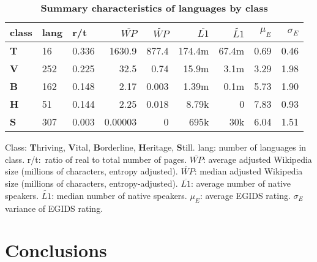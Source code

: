 \documentclass[10pt]{article}
\begin{document}
\begin{table}
\begin{center}
\caption{
\bf{Summary characteristics of languages by class}}
\begin{tabular}{|l|l|l|r|r|r|r|r|r|}
\hline
class &  lang & r/t &  $\overline{WP}$ & $\widetilde{WP}$ & $\overline{L1}$ & $\widetilde{L1}$ & $\mu_E$ & $\sigma_E$\\
\hline
{\bf T} & 16 & 0.336 & 1630.9 & 877.4& 174.4m & 67.4m & 0.69 & 0.46\\
{\bf V} & 252 & 0.225 & 32.5 & 0.74  & 15.9m & 3.1m & 3.29 & 1.98\\
{\bf B} & 162 & 0.148 & 2.17 & 0.003 & 1.39m & 0.1m & 5.73 & 1.90\\
{\bf H} & 51 & 0.144  & 2.25 & 0.018 & 8.79k & 0 & 7.83 & 0.93\\
{\bf S} & 307 & 0.003 & 0.00003 & 0 & 695k & 30k & 6.04 & 1.51\\
\hline
\end{tabular}
\begin{flushleft} Class: {\bf T}hriving, {\bf V}ital,   {\bf B}orderline,
  {\bf H}eritage, {\bf S}till.  lang: number of languages in
  class. r/t:~ratio of real to total number of pages. $\overline{WP}$: average
  adjusted Wikipedia size (millions of characters,
  entropy adjusted). $\widetilde{WP}$: median adjusted Wikipedia size
  (millions of characters,   entropy-adjusted). $\overline{L1}$:
  average number of native speakers. $\widetilde{L1}$:
  median number of native speakers. 
  $\mu_E$: average EGIDS rating.
  $\sigma_E$ variance of EGIDS rating. 
\end{flushleft}
\label{tab:label}
\end{center}
 \end{table}

\section*{Conclusions}
\end{document}
